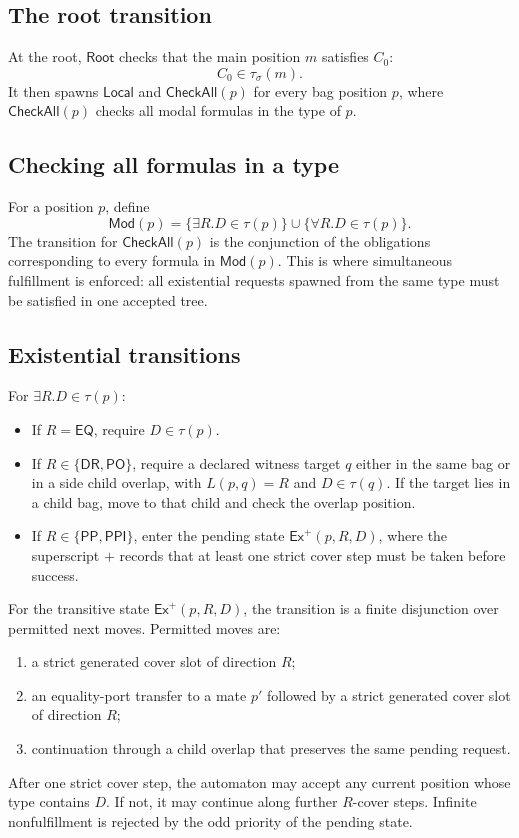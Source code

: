 \documentclass[11pt]{article}
\newcommand{\EQ}{\mathsf{EQ}}
\newcommand{\PP}{\mathsf{PP}}
\newcommand{\PPI}{\mathsf{PPI}}
\newcommand{\PO}{\mathsf{PO}}
\newcommand{\DR}{\mathsf{DR}}
\begin{document}
\subsection{The root transition}

At the root, $\mathsf{Root}$ checks that the main position $m$ satisfies $C_0$:
\[
  C_0\in\tau_\sigma(m).
\]
It then spawns $\mathsf{Local}$ and $\mathsf{CheckAll}(p)$ for every bag position $p$, where $\mathsf{CheckAll}(p)$ checks all modal formulas in the type of $p$.

\subsection{Checking all formulas in a type}

For a position $p$, define
\[
  \mathsf{Mod}(p)=\{\exists R.D\in\tau(p)\}\cup\{\forall R.D\in\tau(p)\}.
\]
The transition for $\mathsf{CheckAll}(p)$ is the conjunction of the obligations corresponding to every formula in $\mathsf{Mod}(p)$.  This is where simultaneous fulfillment is enforced: all existential requests spawned from the same type must be satisfied in one accepted tree.

\subsection{Existential transitions}

For $\exists R.D\in\tau(p)$:
\begin{itemize}
\item If $R=\EQ$, require $D\in\tau(p)$.
\item If $R\in\{\DR,\PO\}$, require a declared witness target $q$ either in the same bag or in a side child overlap, with $L(p,q)=R$ and $D\in\tau(q)$.  If the target lies in a child bag, move to that child and check the overlap position.
\item If $R\in\{\PP,\PPI\}$, enter the pending state $\mathsf{Ex}^{+}(p,R,D)$, where the superscript $+$ records that at least one strict cover step must be taken before success.
\end{itemize}

For the transitive state $\mathsf{Ex}^{+}(p,R,D)$, the transition is a finite disjunction over permitted next moves.  Permitted moves are:
\begin{enumerate}[label=(X\arabic*)]
\item a strict generated cover slot of direction $R$;
\item an equality-port transfer to a mate $p'$ followed by a strict generated cover slot of direction $R$;
\item continuation through a child overlap that preserves the same pending request.
\end{enumerate}
After one strict cover step, the automaton may accept any current position whose type contains $D$.  If not, it may continue along further $R$-cover steps.  Infinite nonfulfillment is rejected by the odd priority of the pending state.
\end{document}
